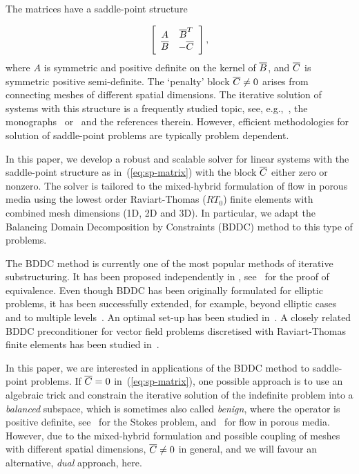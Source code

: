 The matrices have a saddle-point structure%

\begin{equation}
\left[
\begin{array}
[c]{cc}%
A & \ol{B}^{T}\\
\ol{B} & -\ol{C}
\end{array}
\right]  , \label{eq:sp-matrix}%
\end{equation}
where $A$ is symmetric and positive definite on the kernel of $\overline{B}$,
and $\overline{C}$ is symmetric positive semi-definite. The `penalty' 
block $\overline{C}\neq0$ arises from connecting meshes of
different spatial dimensions. The iterative solution of systems with this
structure is a frequently studied topic, see,
e.g.,~\cite{Benzi-2005-NSS,Dohrmann-2006-PBP,Tu-2005-BAM,Tu-2007-BAF}, the
monographs~\cite{Vassilevski-2008-MBF,Elman-2005-FEF} or~\cite[Chapter~9]%
{Toselli-2005-DDM} and the references therein. However, efficient methodologies for
solution of saddle-point problems are typically problem dependent.

In this paper, we develop a robust and scalable solver for linear systems with
the saddle-point structure as in~(\ref{eq:sp-matrix}) with the block$~\overline{C}$
either zero or nonzero. The solver is tailored to the mixed-hybrid formulation of
flow in porous media using the lowest order Raviart-Thomas ($RT_{0}$) finite
elements with combined mesh dimensions (1D, 2D and 3D). In particular, we
adapt the Balancing Domain Decomposition by Constraints (BDDC) method to this
type of problems.

The BDDC method is currently one of the most popular methods of iterative
substructuring. It has been proposed independently in
\cite{Cros-2003-PSC,Dohrmann-2003-PSC,Fragakis-2003-MHP},
see~\cite{Mandel-2007-BFM,Sousedik-2008-EPD} for the proof of equivalence.
Even though BDDC has been originally formulated for elliptic problems, it
has been successfully extended, for example, beyond elliptic
cases~\cite{Li-2006-BAI,Tu-2008-BDD} and to multiple
levels~\cite{Tu-2007-TBT3D,Mandel-2008-MMB}. An optimal set-up has been
studied
in~\cite{Klawonn-2008-AFA,Mandel-2007-ASF,Sistek-2012-FSC,Sousedik-2013-AMB}.
A closely related BDDC preconditioner for vector field problems discretised with Raviart-Thomas finite elements has been studied in~\cite{Oh-2013-BAR}. 


In this paper, we are interested in applications of the BDDC method to
saddle-point problems. If $\overline{C}=0$ in~(\ref{eq:sp-matrix}), one possible approach
is to use an algebraic trick and constrain the iterative solution of the
indefinite problem into a \emph{balanced} subspace, which is sometimes also
called \emph{benign}, where the operator is positive definite,
see~\cite{Li-2006-BAI} for the Stokes problem,
and~\cite{Tu-2005-BAM,Sousedik-2013-NBS,Tu-2011-TBA} for flow in porous media.
However, due to the mixed-hybrid formulation and possible coupling of meshes
with different spatial dimensions, $\overline{C}\neq0$ in general, and we will favour 
an alternative, \emph{dual} approach, here.

